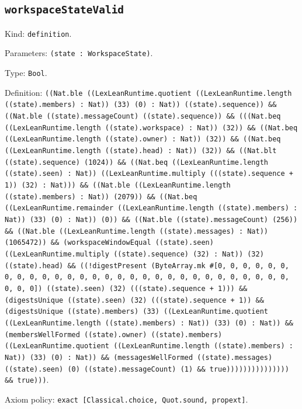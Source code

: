 \documentclass[11pt]{article}
\begin{document}
\subsection*{\texttt{workspaceStateValid}}
\noindent Kind: \texttt{definition}.\par
\noindent Parameters: \texttt{(state : WorkspaceState)}.\par
\noindent Type: \texttt{Bool}.\par
\noindent Definition: \texttt{((Nat.ble ((LexLeanRuntime.quotient ((LexLeanRuntime.length ((state).members) : Nat)) (33) (0) : Nat)) ((state).sequence)) \&\& ((Nat.ble ((state).messageCount) ((state).sequence)) \&\& (((Nat.beq ((LexLeanRuntime.length ((state).workspace) : Nat)) (32)) \&\& ((Nat.beq ((LexLeanRuntime.length ((state).owner) : Nat)) (32)) \&\& ((Nat.beq ((LexLeanRuntime.length ((state).head) : Nat)) (32)) \&\& ((Nat.blt ((state).sequence) (1024)) \&\& ((Nat.beq ((LexLeanRuntime.length ((state).seen) : Nat)) ((LexLeanRuntime.multiply (((state).sequence + 1)) (32) : Nat))) \&\& ((Nat.ble ((LexLeanRuntime.length ((state).members) : Nat)) (2079)) \&\& ((Nat.beq ((LexLeanRuntime.remainder ((LexLeanRuntime.length ((state).members) : Nat)) (33) (0) : Nat)) (0)) \&\& ((Nat.ble ((state).messageCount) (256)) \&\& ((Nat.ble ((LexLeanRuntime.length ((state).messages) : Nat)) (1065472)) \&\& (workspaceWindowEqual ((state).seen) ((LexLeanRuntime.multiply ((state).sequence) (32) : Nat)) (32) ((state).head) \&\& ((!digestPresent (ByteArray.mk \#[0, 0, 0, 0, 0, 0, 0, 0, 0, 0, 0, 0, 0, 0, 0, 0, 0, 0, 0, 0, 0, 0, 0, 0, 0, 0, 0, 0, 0, 0, 0, 0]) ((state).seen) (32) (((state).sequence + 1))) \&\& (digestsUnique ((state).seen) (32) (((state).sequence + 1)) \&\& (digestsUnique ((state).members) (33) ((LexLeanRuntime.quotient ((LexLeanRuntime.length ((state).members) : Nat)) (33) (0) : Nat)) \&\& (membersWellFormed ((state).owner) ((state).members) ((LexLeanRuntime.quotient ((LexLeanRuntime.length ((state).members) : Nat)) (33) (0) : Nat)) \&\& (messagesWellFormed ((state).messages) ((state).seen) (0) ((state).messageCount) (1) \&\& true))))))))))))))) \&\& true)))}.\par
\noindent Axiom policy: \texttt{exact [Classical.choice, Quot.sound, propext]}.\par
\end{document}
